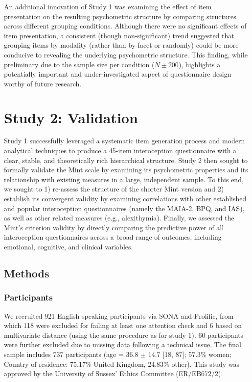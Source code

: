 \documentclass[
  jou,
  floatsintext,
  longtable,
  nolmodern,
  notxfonts,
  notimes,
  colorlinks=true,linkcolor=blue,citecolor=blue,urlcolor=blue]{apa7}
\begin{document}
An additional innovation of Study 1 was examining the effect of item
presentation on the resulting psychometric structure by comparing
structures across different grouping conditions. Although there were no
significant effects of item presentation, a consistent (though
non-significant) trend suggested that grouping items by modality (rather
than by facet or randomly) could be more conducive to revealing the
underlying psychometric structure. This finding, while preliminary due
to the sample size per condition (\(N \pm 200\)), highlights a
potentially important and under-investigated aspect of questionnaire
design worthy of future research.

\section{Study 2: Validation}\label{study-2-validation}

Study 1 successfully leveraged a systematic item generation process and
modern analytical techniques to produce a 45-item interoception
questionnaire with a clear, stable, and theoretically rich hierarchical
structure. Study 2 then sought to formally validate the Mint scale by
examining its psychometric properties and its relationship with existing
measures in a large, independent sample. To this end, we sought to 1)
re-assess the structure of the shorter Mint version and 2) establish its
convergent validity by examining correlations with other established and
popular interoception questionnaires (namely the MAIA-2, BPQ, and IAS),
as well as other related measures (e.g., alexithymia). Finally, we
assessed the Mint's criterion validity by directly comparing the
predictive power of all interoception questionnaires across a broad
range of outcomes, including emotional, cognitive, and clinical
variables.

\subsection{Methods}\label{methods-1}

\subsubsection{Participants}\label{participants-1}

We recruited 921 English-speaking participants via SONA and
Prolific\textcopyright, from which 118 were excluded for failing at
least one attention check and 6 based on multivariate distance (using
the same procedure as for study 1). 60 participants were further
excluded due to missing data following a technical issue. The final
sample includes 737 participants (age = 36.8 \(\pm\) 14.7 {[}18, 87{]};
57.3\% women; Country of residence: 75.17\% United Kingdom, 24.83\%
other). This study was approved by the University of Sussex' Ethics
Committee (ER/EB672/2).
\end{document}
